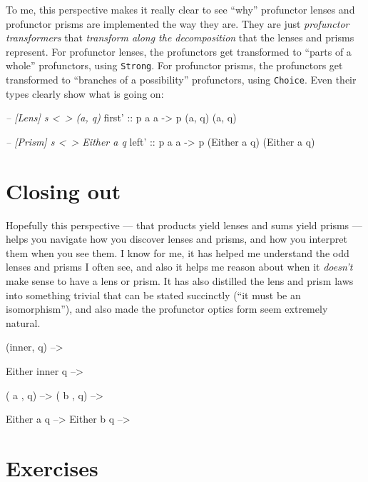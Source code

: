 \documentclass[]{article}
\newenvironment{Shaded}{}{}
\newcommand{\CommentTok}[1]{\textcolor[rgb]{0.38,0.63,0.69}{\textit{#1}}}
\newcommand{\DataTypeTok}[1]{\textcolor[rgb]{0.56,0.13,0.00}{#1}}
\newcommand{\NormalTok}[1]{#1}
\newcommand{\OtherTok}[1]{\textcolor[rgb]{0.00,0.44,0.13}{#1}}
\begin{document}
To me, this perspective makes it really clear to see ``why'' profunctor lenses
and profunctor prisms are implemented the way they are. They are just
\emph{profunctor transformers} that \emph{transform along the decomposition}
that the lenses and prisms represent. For profunctor lenses, the profunctors get
transformed to ``parts of a whole'' profunctors, using \texttt{Strong}. For
profunctor prisms, the profunctors get transformed to ``branches of a
possibility'' profunctors, using \texttt{Choice}. Even their types clearly show
what is going on:

\begin{Shaded}
\begin{Highlighting}[]
\CommentTok{-- [Lens]  s <~> (a, q)}
\OtherTok{first' ::}\NormalTok{ p a a }\OtherTok{->}\NormalTok{ p (a, q) (a, q)}

\CommentTok{-- [Prism] s <~> Either a q}
\OtherTok{left'  ::}\NormalTok{ p a a }\OtherTok{->}\NormalTok{ p (}\DataTypeTok{Either}\NormalTok{ a q) (}\DataTypeTok{Either}\NormalTok{ a q)}
\end{Highlighting}
\end{Shaded}

\hypertarget{closing-out}{%
\section{Closing out}\label{closing-out}}

Hopefully this perspective --- that products yield lenses and sums yield prisms
--- helps you navigate how you discover lenses and prisms, and how you interpret
them when you see them. I know for me, it has helped me understand the odd
lenses and prisms I often see, and also it helps me reason about when it
\emph{doesn't} make sense to have a lens or prism. It has also distilled the
lens and prism laws into something trivial that can be stated succinctly (``it
must be an isomorphism''), and also made the profunctor optics form seem
extremely natural.

(inner, q) --\textgreater{}

Either inner q --\textgreater{}

( a , q) --\textgreater{} ( b , q) --\textgreater{}

Either a q --\textgreater{} Either b q --\textgreater{}

\hypertarget{exercises}{%
\section{Exercises}\label{exercises}}
\end{document}
